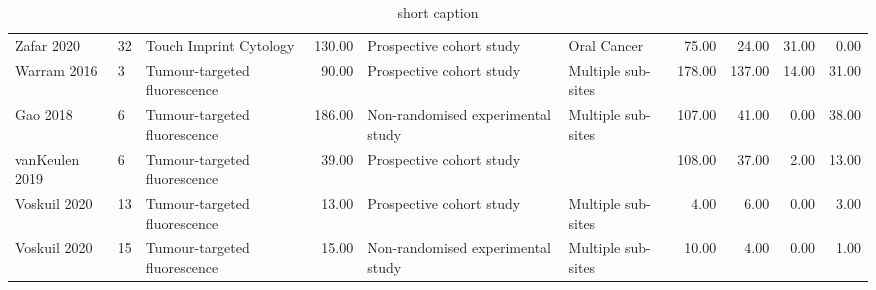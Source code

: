 \begin{table}[ht]
\begin{tabular}{lllrllrrrr}
  Zafar 2020 & 32 & Touch Imprint Cytology & 130.00 & Prospective cohort study & Oral Cancer & 75.00 & 24.00 & 31.00 & 0.00 \\ 
  Warram 2016 & 3 & Tumour-targeted fluorescence & 90.00 & Prospective cohort study & Multiple sub-sites & 178.00 & 137.00 & 14.00 & 31.00 \\ 
  Gao 2018 & 6 & Tumour-targeted fluorescence & 186.00 & Non-randomised experimental study & Multiple sub-sites & 107.00 & 41.00 & 0.00 & 38.00 \\ 
  vanKeulen 2019 & 6 & Tumour-targeted fluorescence & 39.00 & Prospective cohort study &  & 108.00 & 37.00 & 2.00 & 13.00 \\ 
  Voskuil 2020 & 13 & Tumour-targeted fluorescence & 13.00 & Prospective cohort study & Multiple sub-sites & 4.00 & 6.00 & 0.00 & 3.00 \\ 
  Voskuil 2020 & 15 & Tumour-targeted fluorescence & 15.00 & Non-randomised experimental study & Multiple sub-sites & 10.00 & 4.00 & 0.00 & 1.00 \\ 
   \hline
\end{tabular}
\endgroup
\caption[Study details, demographics and outcome data]{short caption} 
\label{tab:study_details}
\end{table}
